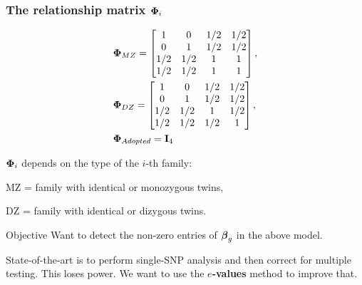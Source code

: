 \documentclass[handout,10pt]{beamer}
\begin{document}
\begin{frame}
\frametitle{The relationship matrix ${\boldsymbol{\Phi}}_i$}
%
\begin{minipage}{.63\textwidth}
%
\begin{align*}
& \bfPhi_{MZ} = \begin{bmatrix}
1 & 0 & 1/2 & 1/2 \\
0 & 1 & 1/2 & 1/2 \\
1/2 & 1/2 & 1 & 1\\
1/2 & 1/2 & 1 & 1
\end{bmatrix},\\
& \bfPhi_{DZ} = \begin{bmatrix}
1 & 0 & 1/2 & 1/2 \\
0 & 1 & 1/2 & 1/2 \\
1/2 & 1/2 & 1 & 1/2\\
1/2 & 1/2 & 1/2 & 1
\end{bmatrix},\vspace{1em}
\\
& \bfPhi_{Adopted} = \bfI_4
\end{align*}
%
\end{minipage}
%
\begin{minipage}{.34\textwidth}
${\boldsymbol{\Phi}}_i$ depends on the type of the $i$-th family:

\vspace{1em}

MZ = family with identical or monozygous twins,

DZ = family with identical or dizygous twins.

\end{minipage}

\end{frame}

\begin{frame}{Objective}
Want to detect the non-zero entries of ${\boldsymbol{\beta}}_g$ in the above model.

\vspace{1em}
State-of-the-art is to perform single-SNP analysis and then correct for multiple testing. This loses power. We want to use the \textbf{$e$-values} method to improve that.
\end{frame}

\end{document}
